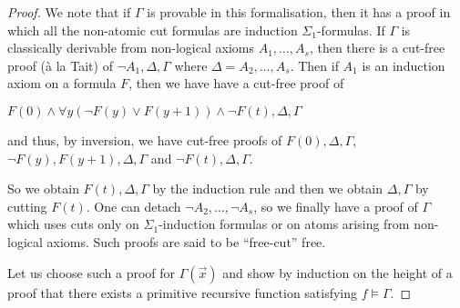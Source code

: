 \documentclass[8pt]{article}
\theoremstyle{definition}
\theoremstyle{definition}
\theoremstyle{definition}
\theoremstyle{definition}
\theoremstyle{definition}
\theoremstyle{definition}
\theoremstyle{definition}
\theoremstyle{definition}
\theoremstyle{definition}
\theoremstyle{definition}
\theoremstyle{definition}
\theoremstyle{definition}
\theoremstyle{definition}
\theoremstyle{question}
\begin{document}
\begin{proof}
  We note that if $\Gamma$ is provable in this formalisation, then
it has a proof in which all the non-atomic cut formulas are induction $\Sigma_1$-formulas.
If $\Gamma$ is classically derivable from non-logical axioms $A_1, \dots, A_s$,
then there is a cut-free proof (\`{a} la Tait) of $\neg A_1, \Delta, \Gamma$ where $\Delta = A_2, \dots, A_s$.
Then if $A_1$ is an induction axiom on a formula $F$, then we have have a cut-free proof of
\begin{center}
  $F(0) \land \forall y (\neg F(y) \lor F(y + 1)) \land \neg F(t), \Delta, \Gamma$
\end{center}
and thus, by inversion, we have cut-free proofs of $F(0), \Delta, \Gamma$, 
$\neg F(y), F(y + 1), \Delta, \Gamma$ and $\neg F(t), \Delta, \Gamma$.

So we obtain $F(t), \Delta, \Gamma$ by the induction rule and then we obtain $\Delta, \Gamma$ by cutting $F(t)$.
One can detach $\neg A_2, \dots, \neg A_s$, so we finally have a proof of $\Gamma$ which uses cuts only
on $\Sigma_1$-induction formulas or on atoms arising from non-logical axioms. Such proofs are said to be ``free-cut'' free.

Let us choose such a proof for $\Gamma(\vec{x})$ and show by induction on the height of a proof that there exists
a primitive recursive function satisfying $f \models \Gamma$.


\end{proof}
\end{document}

